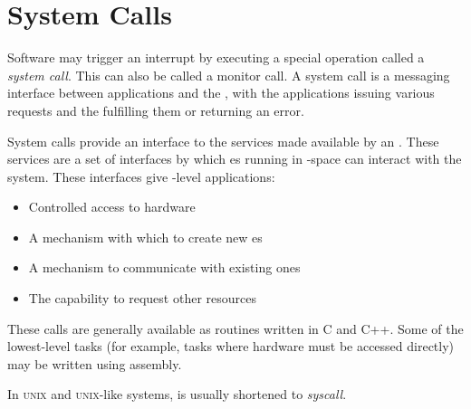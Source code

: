 \section{System Calls}\label{sec:System_Calls}
\begin{definition}\label{def:System_Call}
  Software may trigger an interrupt by executing a special operation called a \emph{system call}.
  This can also be called a monitor call.
  A system call is a messaging interface between applications and the , with the applications issuing various requests and the  fulfilling them or returning an error.

  System calls provide an interface to the services made available by an .
  These services are a set of interfaces by which es running in -space can interact with the system.
  These interfaces give -level applications:
  \begin{itemize}[noitemsep]
  \item Controlled access to hardware
  \item A mechanism with which to create new es
  \item A mechanism to communicate with existing ones
  \item The capability to request other  resources
  \end{itemize}

  These calls are generally available as routines written in C and C++.
  Some of the lowest-level tasks (for example, tasks where hardware must be accessed directly) may be written using assembly.

  \begin{remark}[Syscall]\label{rmk:Syscall}
    In \textsc{unix} and \textsc{unix}-like systems,  is usually shortened to \emph{syscall}.
  \end{remark}
\end{definition}

